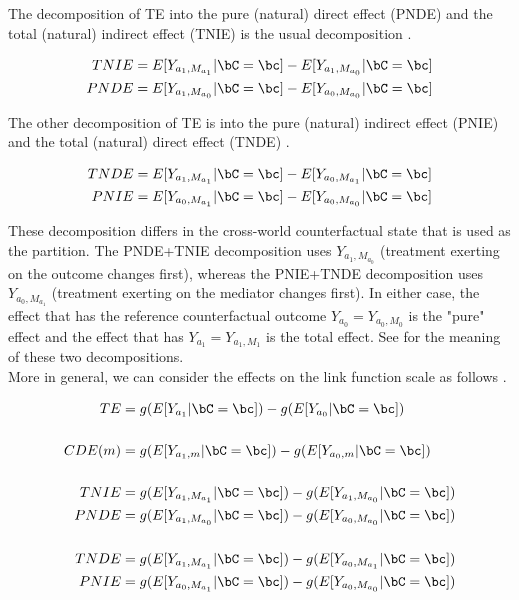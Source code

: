 \documentclass[dvipdfmx,10pt]{article}
\begin{document}
The decomposition of TE into the pure (natural) direct effect (PNDE) and the total (natural) indirect effect (TNIE) is the usual decomposition \cite{pearlDirectIndirectEffects2001}.

\begin{align*}
TNIE &= E[Y_{a_{1},M_{a_{1}}} | \bC = \bc] - E[Y_{a_{1},M_{a_{0}}} | \bC = \bc]\\
PNDE &= E[Y_{a_{1},M_{a_{0}}} | \bC = \bc] - E[Y_{a_{0},M_{a_{0}}} | \bC = \bc]\\
\end{align*}

The other decomposition of TE is into the pure (natural) indirect effect (PNIE) and the total (natural) direct effect (TNDE) \cite{robinsIdentifiabilityExchangeabilityDirect1992}.

\begin{align*}
TNDE &= E[Y_{a_{1},M_{a_{1}}} | \bC = \bc] - E[Y_{a_{0},M_{a_{1}}} | \bC = \bc]\\
PNIE &= E[Y_{a_{0},M_{a_{1}}} | \bC = \bc] - E[Y_{a_{0},M_{a_{0}}} | \bC = \bc]\\
\end{align*}

These decomposition differs in the cross-world counterfactual state that is used as the partition. The PNDE+TNIE decomposition uses \(Y_{a_{1},M_{a_{0}}}\) (treatment exerting on the outcome changes first), whereas the PNIE+TNDE decomposition uses \(Y_{a_{0},M_{a_{1}}}\) (treatment exerting on the mediator changes first). In either case, the effect that has the reference counterfactual outcome \(Y_{a_{0}} = Y_{a_{0},M_{0}}\) is the "pure" effect and the effect that has \(Y_{a_{1}} = Y_{a_{1},M_{1}}\) is the total effect. See \cite{vanderweeleThreewayDecompositionTotal2013} for the meaning of these two decompositions.\\

More in general, we can consider the effects on the link function scale as follows \cite{starkopfComparisonFiveSoftware2017}.

\begin{align*}
TE &= g(E[Y_{a_{1}} | \bC = \bc]) - g(E[Y_{a_{0}} | \bC = \bc])\\
\\
CDE(m) &= g(E[Y_{a_{1},m} | \bC = \bc]) - g(E[Y_{a_{0},m} | \bC = \bc])\\
\\
TNIE &= g(E[Y_{a_{1},M_{a_{1}}} | \bC = \bc]) - g(E[Y_{a_{1},M_{a_{0}}} | \bC = \bc])\\
PNDE &= g(E[Y_{a_{1},M_{a_{0}}} | \bC = \bc]) - g(E[Y_{a_{0},M_{a_{0}}} | \bC = \bc])\\
\\
TNDE &= g(E[Y_{a_{1},M_{a_{1}}} | \bC = \bc]) - g(E[Y_{a_{0},M_{a_{1}}} | \bC = \bc])\\
PNIE &= g(E[Y_{a_{0},M_{a_{1}}} | \bC = \bc]) - g(E[Y_{a_{0},M_{a_{0}}} | \bC = \bc])\\
\end{align*}
\end{document}
